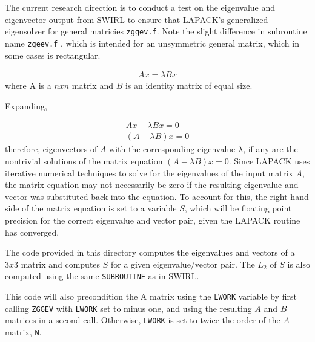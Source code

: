 \documentclass[a4paper]{article}
\begin{document}
The current research direction is to conduct a test on the eigenvalue and eigenvector
output from SWIRL to ensure that LAPACK's generalized eigensolver for general matricies \verb|zggev.f|. Note the
slight difference in subroutine name \verb|zgeev.f| , which is intended for an unsymmetric general matrix, which in some cases 
is rectangular. 

\begin{align*}
    A {x} = \lambda B {x}
\end{align*}
where A is a $n x n$ matrix and $B$ is an identity matrix of equal size. 

Expanding,

\begin{align*}
    A {x} - \lambda B {x} = 0 \\
    (A - \lambda B) {x} = 0 
\end{align*}
therefore, eigenvectors of $A$ with the corresponding eigenvalue $\lambda$, if any
are the nontrivial solutions of the matrix equation $(A - \lambda B) {x} = 0$.
Since LAPACK uses iterative numerical techniques to solve for the eigenvalues
of the input matrix $A$, the matrix equation may not necessarily be zero if the resulting eigenvalue and
vector was substituted back into the equation. To account for this, the right 
hand side of the matrix equation is set to a variable $S$, which will be floating 
point precision for the correct eigenvalue and vector pair, given the LAPACK routine
has converged. 

The code provided in this directory computes the eigenvalues and vectors 
of a $3x3$ matrix and computes $S$ for a given eigenvalue/vector pair. The $L_2$ of $S$ is
also computed using the same \verb|SUBROUTINE| as in SWIRL. 

This code will also precondition the A matrix using the \verb|LWORK| variable by
first calling \verb|ZGGEV| with \verb|LWORK| set to minus one, and using the resulting 
$A$ and $B$ matrices in a second call. Otherwise, \verb|LWORK| is set to twice the order of the $A$ matrix,
\verb|N|. 
%
%
%    
%
%
\end{document}
